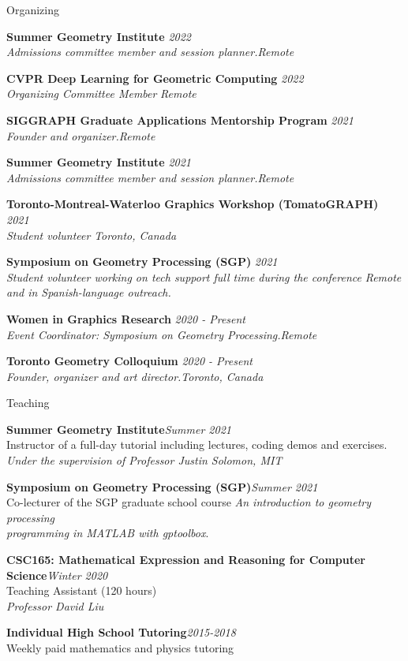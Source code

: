 \documentclass{resume} %
\begin{document}
\begin{rSection}{Organizing}

{\bf Summer Geometry Institute} \hfill {\em 2022}\\ 
{\it Admissions committee member and session planner.}\hfill {\em Remote}

{\bf CVPR Deep Learning for Geometric Computing} \hfill {\em 2022}\\ 
{\it Organizing Committee Member} \hfill {\em Remote}

{\bf SIGGRAPH Graduate Applications Mentorship Program} \hfill {\em 2021}\\ 
{\it Founder and organizer.}\hfill {\em Remote}

{\bf Summer Geometry Institute} \hfill {\em 2021}\\ 
{\it Admissions committee member and session planner.}\hfill {\em Remote}

{\bf Toronto-Montreal-Waterloo Graphics Workshop (TomatoGRAPH)} \hfill {\em 2021}\\ 
{\it Student volunteer} \hfill {\em Toronto, Canada}

{\bf Symposium on Geometry Processing (SGP)} \hfill {\em 2021}\\ 
{\it Student volunteer working on tech support full time during the conference} \hfill {\em Remote}\\
{\it and in Spanish-language outreach.}

{\bf Women in Graphics Research} \hfill {\em 2020 - Present}\\ 
{\it Event Coordinator: Symposium on Geometry Processing.}\hfill {\em Remote}

{\bf Toronto Geometry Colloquium} \hfill {\em 2020 - Present}\\ 
{\it Founder, organizer and art director.}\hfill {\em Toronto, Canada}

\end{rSection}


\begin{rSection}{Teaching}


{\bf  Summer Geometry Institute}\hfill {\em Summer 2021} \\ 
Instructor of a full-day tutorial including lectures, coding demos and exercises.\\
{\it Under the supervision of Professor Justin Solomon, MIT}

{\bf  Symposium on Geometry Processing (SGP)}\hfill {\em Summer 2021} \\ 
Co-lecturer of the SGP graduate school course {\it An introduction to geometry processing}\\ {\it  programming in MATLAB with gptoolbox}.

{\bf  CSC165: Mathematical Expression and Reasoning for Computer Science}\hfill {\em Winter 2020} \\ 
Teaching Assistant (120 hours)\\
{\it Professor David Liu}

{\bf  Individual High School Tutoring}\hfill {\em 2015-2018} \\ 
Weekly paid mathematics and physics tutoring

\end{rSection}
\end{document}
